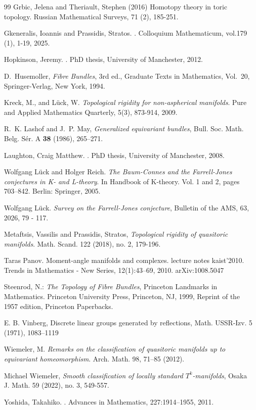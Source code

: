\documentclass[11pt,a4paper]{article}
\numberwithin{equation}{section}
\theoremstyle{named}
\begin{document}
\begin{thebibliography}{99}
Grbic, Jelena and Theriault, Stephen (2016) Homotopy theory in toric topology. Russian Mathematical Surveys, 71 (2), 185-251.

Gkeneralis, Ioannis and Prassidis, Stratos.
.
\newblock Colloquium Mathematicum, vol.179 (1), 1-19, 2025.

Hopkinson, Jeremy.
.
\newblock PhD thesis, University of Manchester, 2012.

D.~Husemoller, \emph{Fibre Bundles}, 3rd ed., Graduate Texts in Mathematics, Vol.~20, Springer-Verlag, New York, 1994.

Kreck, M., and Lück, W. \emph{Topological rigidity for non-aspherical manifolds}. Pure and Applied Mathematics Quarterly, 5(3), 873-914, 2009.

R.~K. Lashof and J.~P. May, \emph{Generalized equivariant bundles}, Bull. Soc. Math. Belg. S\'er. A \textbf{38} (1986), 265--271.

Laughton, Craig Matthew.
.
\newblock PhD thesis, University of Manchester, 2008.

Wolfgang L\"uck and Holger Reich. \emph{The Baum-Connes and the Farrell-Jones conjectures in K- and L-theory}. In Handbook of K-theory. Vol. 1 and 2, pages 703–842. Berlin: Springer, 2005.

Wolfgang L\"uck. \emph{Survey on the Farrell-Jones conjecture}, Bulletin of the AMS, 63, 2026, 79 - 117.

Metaftsis, Vassilis and Prassidis, Stratos, \emph{Topological rigidity of quasitoric manifolds}. Math. Scand. 122 (2018), no. 2, 179-196.

Taras Panov. Moment-angle manifolds and complexes. lecture notes kaist’2010. Trends in Mathematics - New Series, 12(1):43–69, 2010. arXiv:1008.5047

Steenrod, N.: \emph{The Topology of Fibre Bundles}, Princeton Landmarks in Mathematics. Princeton University Press, Princeton, NJ, 1999, Reprint of the 1957 edition, Princeton Paperbacks.

E. B. Vinberg, Discrete linear groups generated by reflections, Math. USSR-Izv. 5 (1971), 1083–1119

Wiemeler, M. \emph{Remarks on the classification of quasitoric manifolds up to equivariant homeomorphism}. Arch. Math. 98, 71–85 (2012).

Michael Wiemeler, \emph{Smooth classification of locally standard $T^k$-manifolds}, Osaka J. Math. 59 (2022), no. 3, 549-557. 

Yoshida, Takahiko.
.
\newblock Advances in Mathematics, 227:1914--1955, 2011.

\end{thebibliography}
\end{document}
